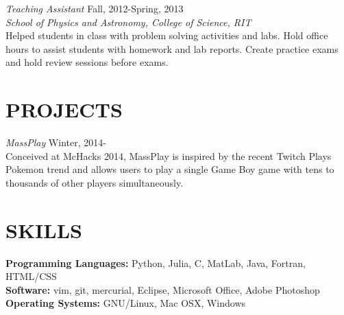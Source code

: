 \documentclass[margin]{res}
\begin{document}
\begin{resume}
  {\sl Teaching Assistant} \hfill            Fall, 2012-Spring, 2013 \\
  {\sl School of Physics and Astronomy, College of Science, RIT}\\
  Helped students in class with problem solving activities and labs.
  Hold office hours to assist students with homework and lab reports.
  Create practice exams and hold review sessions before exams.

\section{PROJECTS}

	 {\sl MassPlay} \hfill            Winter, 2014- \\
	 Conceived at McHacks 2014, MassPlay is inspired by the recent Twitch Plays Pokemon trend
	 and allows users to play a single Game Boy game with tens to thousands of other players
	 simultaneously.         
                 

\section{SKILLS}
\textbf{Programming Languages:} Python, Julia, C, MatLab, Java, Fortran, HTML/CSS \\
\textbf{Software:} vim, git, mercurial, Eclipse, Microsoft Office, Adobe Photoshop \\
\textbf{Operating Systems:} GNU/Linux, Mac OSX, Windows
 

                 
            
                 

\end{resume}
\end{document}
